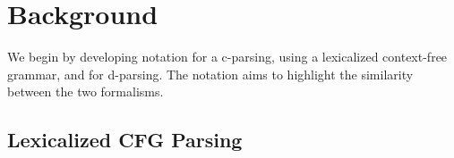 \documentclass[11pt,letterpaper]{article}
\newcommand{\nascomment}[1]{\textcolor{blue}{\bf \small [#1 --nas]}}
\begin{document}





\section{Background}

We begin by developing notation for a c-parsing, using a lexicalized context-free grammar, and for d-parsing. The notation aims to highlight the similarity between the two formalisms.

\subsection{Lexicalized CFG Parsing}
\end{document}
